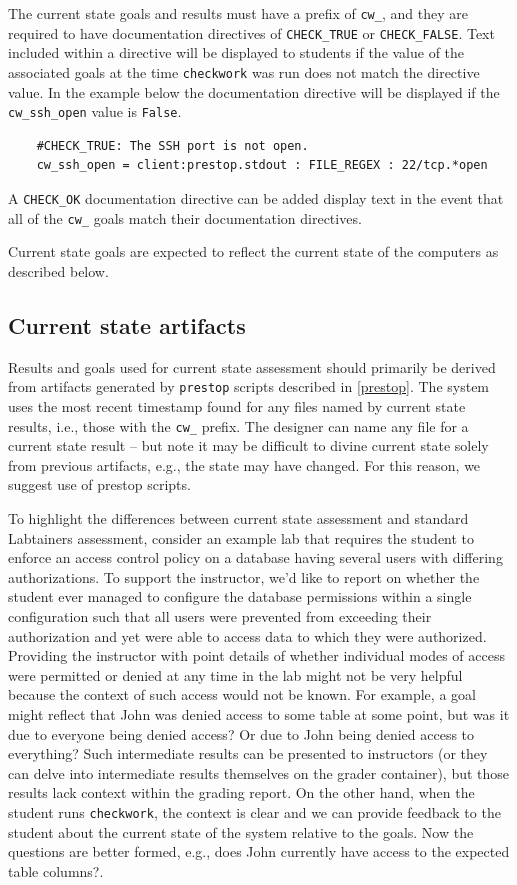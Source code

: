 \documentclass[12pt]{article}
\begin{document}
The current state goals and results must have a prefix of {\tt cw\_}, and they
are required to have documentation directives of {\tt CHECK\_TRUE} or {\tt CHECK\_FALSE}.
Text included within a directive will be displayed to students if the value
of the associated goals at the time {\tt checkwork} was run does not match the directive value.  
In the example below the documentation directive will be displayed if the {\tt cw\_ssh\_open}
value is {\tt False}.
\begin{verbatim}
    #CHECK_TRUE: The SSH port is not open. 
    cw_ssh_open = client:prestop.stdout : FILE_REGEX : 22/tcp.*open
\end{verbatim}
\noindent A {\tt CHECK\_OK} documentation directive can be added display text in the event that
all of the {\tt cw\_} goals match their documentation directives.

Current state goals
are expected to reflect the current state of the computers as described below.

\subsection {Current state artifacts}
Results and goals used for current state assessment should primarily be derived from artifacts generated by {\tt prestop} scripts 
described in \ref{prestop}.  The system uses the most recent timestamp found for any files named by current state
results, i.e., those with the {\tt cw\_} prefix.  The designer can name any file for a current state result -- but note it may
be difficult to divine current state solely from previous artifacts, e.g., the state may have changed.  For this reason, we
suggest use of prestop scripts.

To highlight the differences between current state assessment and standard Labtainers assessment, consider an example
lab that requires the student to enforce an access control policy on a database having several users with differing
authorizations.  To support the instructor, we'd like to report on whether the student ever managed to configure the
database permissions within a single configuration such that all users were prevented from exceeding their authorization and 
yet were able to access data to which they were authorized.  Providing the instructor with point details of whether individual
modes of access were permitted or denied at any time in the lab might not be very helpful because the context of such access
would not be known.  For example, a goal might reflect that John was denied access to some table at some point, but was it due to everyone being 
denied access?  Or due to John being denied access to everything?  Such intermediate results can be presented to instructors
(or they can delve into intermediate results themselves on the grader container), but those results lack context within the 
grading report.  On the other hand, when the student runs {\tt checkwork}, the context is clear and we can provide feedback
to the student about the current state of the system relative to the goals.  Now the questions are better formed, e.g., 
does John currently have access to the expected table columns?.
\end{document}
